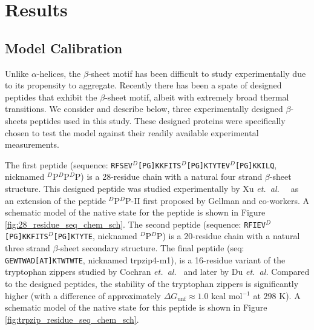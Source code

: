 \section{Results 
\label{sec:results}}

\subsection{Model Calibration}

Unlike $\alpha$-helices, the $\beta$-sheet motif has been difficult to study experimentally due to its propensity to aggregate. Recently there has been a spate of designed peptides that exhibit the $\beta$-sheet motif, albeit with extremely broad thermal transitions.\cite{cochran_tryptophan_2001} We consider and describe below, three experimentally designed $\beta$-sheets peptides used in this study. These designed proteins were specifically chosen to test the model against their readily available experimental measurements. 

The first peptide (sequence: \texttt{RFSEV$^D$[PG]\linebreak[0]KKFITS$^D$[PG]\linebreak[0]KTYTEV$^D$[PG]\linebreak[0]KKILQ}, nicknamed $^D$P$^D$P$^D$P) is a 28-residue chain with a natural four strand $\beta$-sheet structure. This designed peptide was studied experimentally by Xu \textit{et.\ al.\ }~\cite{xu_probing_2008} as an extension of the peptide $^D$P$^D$P-II first proposed by Gellman and co-workers.\cite{syud_influence_2003} A schematic model of the native state for the peptide is shown in Figure \ref{fig:28_residue_seq_chem_sch}. The second peptide (sequence: \texttt{RFIEV$^D$[PG]\linebreak[0]KKFITS$^D$[PG]\linebreak[0]KTYTE}, nicknamed $^D$P$^D$P) is a 20-residue chain with a natural three strand $\beta$-sheet secondary structure.\cite{hudson_measuring_2006} The final peptide (seq: \texttt{GEWTWAD[AT]\linebreak[0]KTWTWTE}, nicknamed trpzip4-m1), is a 16-residue variant of the tryptophan zippers studied by Cochran \textit{et.\ al.\ }\cite{cochran_tryptophan_2001} and later by Du \textit{et.\ al.}\cite{du_understanding_2006} Compared to the designed peptides, the stability of the tryptophan zippers is significantly higher (with a difference of approximately $\Delta G_{\text{unf}} \approx 1.0$ kcal mol$^{-1}$ at $298$ K). A schematic model of the native state for this peptide is shown in Figure \ref{fig:trpzip_residue_seq_chem_sch}.

